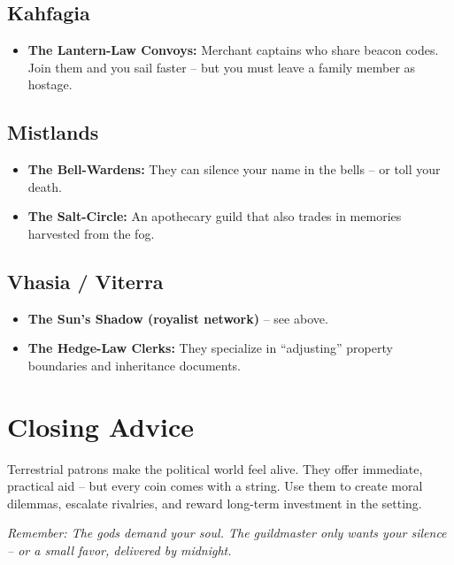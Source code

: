 \subsection*{Kahfagia}
\begin{itemize}
  \item \textbf{The Lantern-Law Convoys:} Merchant captains who share beacon codes. Join them and you sail faster – but you must leave a family member as hostage.
\end{itemize}

\subsection*{Mistlands}
\begin{itemize}
  \item \textbf{The Bell-Wardens:} They can silence your name in the bells – or toll your death.
  \item \textbf{The Salt-Circle:} An apothecary guild that also trades in memories harvested from the fog.
\end{itemize}

\subsection*{Vhasia / Viterra}
\begin{itemize}
  \item \textbf{The Sun’s Shadow (royalist network)} – see above.
  \item \textbf{The Hedge-Law Clerks:} They specialize in “adjusting” property boundaries and inheritance documents.
\end{itemize}

\section{Closing Advice}

Terrestrial patrons make the political world feel alive. They offer immediate, practical aid – but every coin comes with a string. Use them to create moral dilemmas, escalate rivalries, and reward long-term investment in the setting.

\emph{Remember: The gods demand your soul. The guildmaster only wants your silence – or a small favor, delivered by midnight.}
